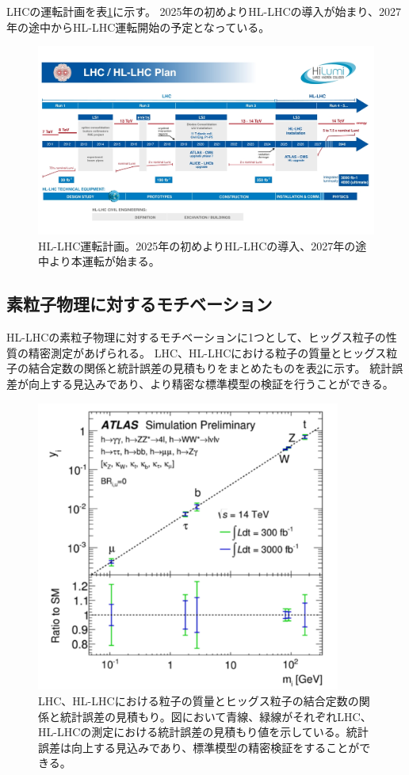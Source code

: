 LHCの運転計画を表\ref{hllhc_plan}に示す。
2025年の初めよりHL-LHCの導入が始まり、2027年の途中からHL-LHC運転開始の予定となっている。
\begin{figure}[bpt]\centering
\includegraphics[width=12cm]{./hllhc_plan.jpg}
\caption[HL-LHC運転計画]{HL-LHC運転計画\cite{1-7}。2025年の初めよりHL-LHCの導入、2027年の途中より本運転が始まる。}
\label{hllhc_plan}
\end{figure}

\subsection{素粒子物理に対するモチベーション}
HL-LHCの素粒子物理に対するモチベーションに1つとして、ヒッグス粒子の性質の精密測定があげられる。
LHC、HL-LHCにおける粒子の質量とヒッグス粒子の結合定数の関係と統計誤差の見積もりをまとめたものを表\ref{higgs_uncertainty}に示す。
統計誤差が向上する見込みであり、より精密な標準模型の検証を行うことができる。

\begin{figure}[bpt]\centering
\includegraphics[width=10cm]{./higgs_uncertainty.pdf}
\caption[LHC、HL-LHCにおける粒子の質量とヒッグス粒子の結合定数の関係と統計誤差の見積もり]{LHC、HL-LHCにおける粒子の質量とヒッグス粒子の結合定数の関係と統計誤差の見積もり\cite{1-12}。図において青線、緑線がそれぞれLHC、HL-LHCの測定における統計誤差の見積もり値を示している。統計誤差は向上する見込みであり、標準模型の精密検証をすることができる。}
\label{higgs_uncertainty}
\end{figure}


